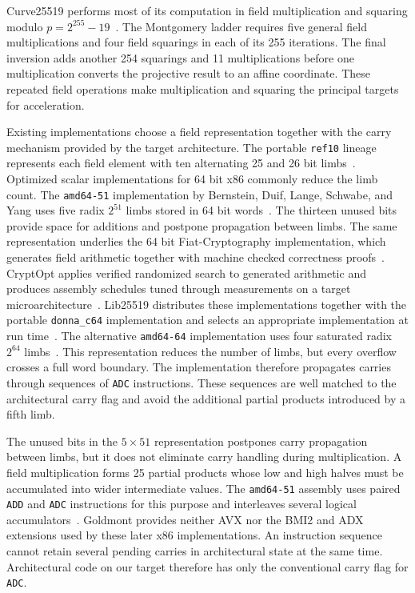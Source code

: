 \documentclass[journal=tches,submission]{iacrtrans}
\newcommand{\code}[1]{\texttt{#1}}
\begin{document}
Curve25519 performs most of its computation in field multiplication and squaring modulo $p=2^{255}-19$~\cite{PKC:Bernstein06}.
The Montgomery ladder requires five general field multiplications and four field squarings in each of its 255 iterations.
The final inversion adds another 254 squarings and 11 multiplications before one multiplication converts the projective result to an affine coordinate.
These repeated field operations make multiplication and squaring the principal targets for acceleration.

Existing implementations choose a field representation together with the carry mechanism provided by the target architecture.
The portable \texttt{ref10} lineage represents each field element with ten alternating 25 and 26 bit limbs~\cite{PKC:Bernstein06,lib25519}.
Optimized scalar implementations for 64 bit x86 commonly reduce the limb count.
The \texttt{amd64-51} implementation by Bernstein, Duif, Lange, Schwabe, and Yang uses five radix $2^{51}$ limbs stored in 64 bit words~\cite{bernsteinHighspeed2011}.
The thirteen unused bits provide space for additions and postpone propagation between limbs.
The same representation underlies the 64 bit Fiat-Cryptography implementation, which generates field arithmetic together with machine checked correctness proofs~\cite{SP:EPGSC19}.
CryptOpt applies verified randomized search to generated arithmetic and produces assembly schedules tuned through measurements on a target microarchitecture~\cite{kuepperCryptOpt2023}.
Lib25519 distributes these implementations together with the portable \texttt{donna\_c64} implementation and selects an appropriate implementation at run time~\cite{lib25519}.
The alternative \texttt{amd64-64} implementation uses four saturated radix $2^{64}$ limbs~\cite{bernsteinHighspeed2011}.
This representation reduces the number of limbs, but every overflow crosses a full word boundary.
The implementation therefore propagates carries through sequences of \code{ADC} instructions.
These sequences are well matched to the architectural carry flag and avoid the additional partial products introduced by a fifth limb.

The unused bits in the $5\times51$ representation postpones carry propagation between limbs, but it does not eliminate carry handling during multiplication.
A field multiplication forms 25 partial products whose low and high halves must be accumulated into wider intermediate values.
The \texttt{amd64-51} assembly uses paired \code{ADD} and \code{ADC} instructions for this purpose and interleaves several logical accumulators~\cite{bernsteinHighspeed2011,lib25519}.
Goldmont provides neither AVX nor the BMI2 and ADX extensions used by these later x86 implementations.
An instruction sequence cannot retain several pending carries in architectural state at the same time.
Architectural code on our target therefore has only the conventional carry flag for \code{ADC}.
\end{document}
